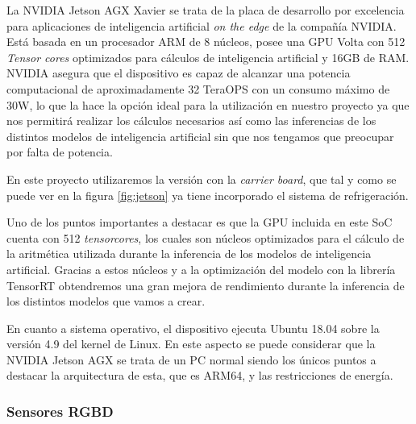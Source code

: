 La NVIDIA Jetson AGX Xavier se trata de la placa de desarrollo por excelencia para aplicaciones de inteligencia artificial \textit{on the edge} de la compañía NVIDIA.
Está basada en un procesador ARM de 8 núcleos, posee una GPU Volta con 512 \textit{Tensor cores} optimizados para cálculos de inteligencia artificial y 16GB de RAM. NVIDIA asegura que el dispositivo es capaz de alcanzar una potencia computacional de aproximadamente 32 TeraOPS con un consumo máximo de 30W, lo que la hace la opción ideal para la utilización en nuestro proyecto ya que nos permitirá realizar los cálculos necesarios así como las inferencias de los distintos modelos de inteligencia artificial sin que nos tengamos que preocupar por falta de potencia.

En este proyecto utilizaremos la versión con la \textit{carrier board}, que tal y como se puede ver en la figura \ref{fig:jetson} ya tiene incorporado el sistema de refrigeración. 

Uno de los puntos importantes a destacar es que la GPU incluida en este SoC cuenta con 512 \textit{tensorcores}, los cuales son núcleos optimizados para el cálculo de la aritmética utilizada durante la inferencia de los modelos de inteligencia artificial. Gracias a estos núcleos y a la optimización del modelo con la librería TensorRT obtendremos una gran mejora de rendimiento durante la inferencia de los distintos modelos que vamos a crear.

En cuanto a sistema operativo, el dispositivo ejecuta Ubuntu 18.04 sobre la versión 4.9 del kernel de Linux. En este aspecto se puede considerar que la NVIDIA Jetson AGX se trata de un PC normal siendo los únicos puntos a destacar la arquitectura de esta, que es ARM64, y las restricciones de energía.


\subsubsection{Sensores RGBD}


